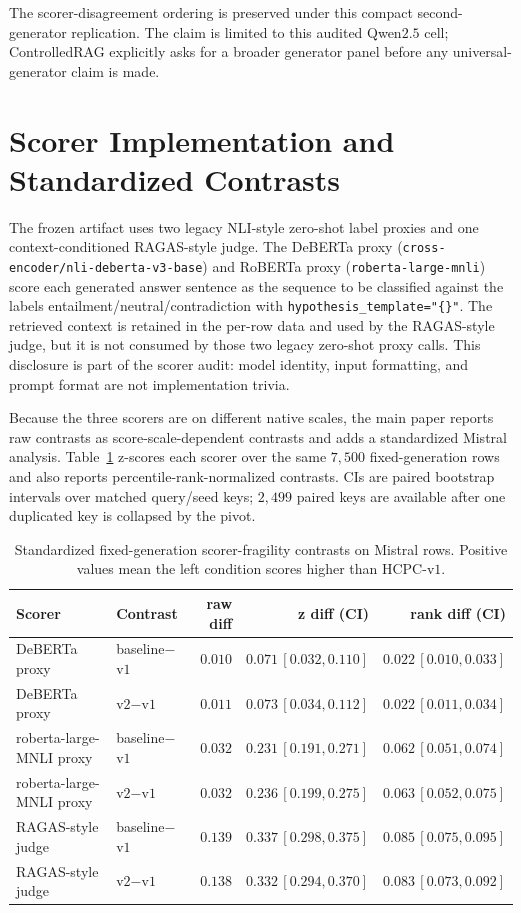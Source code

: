 \documentclass[11pt]{article}
\begin{document}
The scorer-disagreement ordering is preserved under this compact
second-generator replication. The claim is limited to this audited
Qwen$2.5$ cell; ControlledRAG explicitly asks for a broader generator
panel before any universal-generator claim is made.

\section{Scorer Implementation and Standardized Contrasts}
\label{supp:scorer_standardized}

The frozen artifact uses two legacy NLI-style zero-shot label proxies
and one context-conditioned RAGAS-style judge. The DeBERTa proxy
(\nolinkurl{cross-encoder/nli-deberta-v3-base}) and RoBERTa proxy
(\nolinkurl{roberta-large-mnli}) score each generated answer sentence
as the sequence to be classified against the labels
entailment/neutral/contradiction with
\texttt{hypothesis\_template="\{\}"}. The retrieved context is retained
in the per-row data and used by the RAGAS-style judge, but it is not
consumed by those two legacy zero-shot proxy calls. This disclosure is
part of the scorer audit: model identity, input formatting, and prompt
format are not implementation trivia.

Because the three scorers are on different native scales, the main
paper reports raw contrasts as score-scale-dependent contrasts and
adds a standardized Mistral analysis. Table~\ref{tab:supp:standardized}
z-scores each scorer over the same $7{,}500$ fixed-generation rows and
also reports percentile-rank-normalized contrasts. CIs are paired
bootstrap intervals over matched query/seed keys; $2{,}499$ paired keys
are available after one duplicated key is collapsed by the pivot.

\begin{table}[!htb]
\centering
\caption{Standardized fixed-generation scorer-fragility contrasts on
Mistral rows. Positive values mean the left condition scores higher
than HCPC-v$1$.}
\label{tab:supp:standardized}
\scriptsize
\begin{tabular}{llrrr}
\toprule
Scorer & Contrast & raw diff & z diff (CI) & rank diff (CI) \\
\midrule
DeBERTa proxy & baseline$-$v$1$ & $0.010$ & $0.071\,[0.032,0.110]$ & $0.022\,[0.010,0.033]$ \\
DeBERTa proxy & v$2$$-$v$1$ & $0.011$ & $0.073\,[0.034,0.112]$ & $0.022\,[0.011,0.034]$ \\
roberta-large-MNLI proxy & baseline$-$v$1$ & $0.032$ & $0.231\,[0.191,0.271]$ & $0.062\,[0.051,0.074]$ \\
roberta-large-MNLI proxy & v$2$$-$v$1$ & $0.032$ & $0.236\,[0.199,0.275]$ & $0.063\,[0.052,0.075]$ \\
RAGAS-style judge & baseline$-$v$1$ & $0.139$ & $0.337\,[0.298,0.375]$ & $0.085\,[0.075,0.095]$ \\
RAGAS-style judge & v$2$$-$v$1$ & $0.138$ & $0.332\,[0.294,0.370]$ & $0.083\,[0.073,0.092]$ \\
\bottomrule
\end{tabular}
\end{table}
\end{document}
